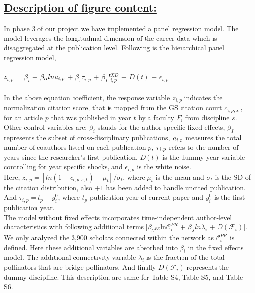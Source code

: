 \documentclass{article}\usepackage[]{graphicx}\usepackage[]{color}
\begin{document}
\subsection*{\underline{Description of figure content:}}
\par{
In phase 3 of our project we have implemented a panel regression model. The model leverages the longitudinal dimension of the career data which is disaggregated at the publication level. Following is the hierarchical panel regression model,\\\\ 

\quad \quad \quad \quad \quad \quad $z{_{i,p}}$ = ${{\beta}_i}$ + ${{\beta}_\alpha}ln{\it{a}_{i,p}}$ + ${{\beta}_{\tau}}{{\tau}_{i,p}}$ + ${{\beta}_I}I{^{XD}_{i,p}}$ + $D(t)$ + ${\epsilon}{_{i,p}}$ \\\\


In the above equation coefficient, the response variable $z{_{i,p}}$ indicates the normalization citation score, that is mapped from the GS citation count $c_{i,p,s,t}$ for an article $p$ that was published in year $t$ by a faculty $F_i$ from discipline $s$. Other control variables are: ${{\beta}_i}$ stands for the author specific fixed effects, ${{\beta}_I}$ represents the subset of cross-disciplinary publications, ${\it{a}_{i,p}}$ measures the total number of coauthors listed on each publication $p$, ${\it{\tau}_{i,p}}$ refers to the number of years since the researcher's first publication. $D(t)$ is the dummy year variable controlling for year specific shocks, and ${\epsilon}_{i,p}$ is the white noise.\\

Here, $z{_{i,p}} = [ln (1 + c_{i,p,s,t}) - {\mu}_t] / {\sigma}_t$, where ${\mu}_t$ is the mean and ${\sigma}_t$ is the SD of the citation distribution, also $+1$ has been added to handle uncited publication. And ${{\tau}_{i,p}} = t_p - y^0_i$, where $t_p$ publication year of current paper and $y^0_i$ is the first publication year. \\

The model without fixed effects incorporates time-independent author-level characteristics with following additional terms [$\beta_{\mathscr{C}^{PR}}$ln${\mathscr{C}^{PR}_{i}}$ + $\beta_{\lambda}ln{\lambda}_{i}$ + $D(\mathscr{F}{_i})$]. We only analyzed the 3,900 scholars connected within the network as ${\mathscr{C}^{PR}_{i}}$ is defined. Here these additional variables are absorbed into $\beta_{i}$ in the fixed effects model. The additional connectivity variable ${{\lambda}_i}$ is the fraction of the total pollinators that are bridge pollinators. And finally $D(\mathscr{F}{_i})$ represents the dummy discipline. This description are same for Table S4, Table S5, and Table S6. \\
 
}
\end{document}
